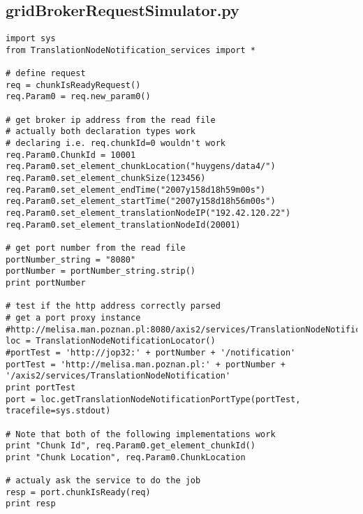 \subsection{gridBrokerRequestSimulator.py}
\begin{verbatim}
import sys
from TranslationNodeNotification_services import *

# define request
req = chunkIsReadyRequest()
req.Param0 = req.new_param0()

# get broker ip address from the read file
# actually both declaration types work
# declaring i.e. req.chunkId=0 wouldn't work
req.Param0.ChunkId = 10001
req.Param0.set_element_chunkLocation("huygens/data4/")
req.Param0.set_element_chunkSize(123456)
req.Param0.set_element_endTime("2007y158d18h59m00s")
req.Param0.set_element_startTime("2007y158d18h56m00s")
req.Param0.set_element_translationNodeIP("192.42.120.22")
req.Param0.set_element_translationNodeId(20001)

# get port number from the read file
portNumber_string = "8080"
portNumber = portNumber_string.strip()
print portNumber

# test if the http address correctly parsed
# get a port proxy instance
#http://melisa.man.poznan.pl:8080/axis2/services/TranslationNodeNotification
loc = TranslationNodeNotificationLocator()
#portTest = 'http://jop32:' + portNumber + '/notification'
portTest = 'http://melisa.man.poznan.pl:' + portNumber +
'/axis2/services/TranslationNodeNotification'
print portTest
port = loc.getTranslationNodeNotificationPortType(portTest,
tracefile=sys.stdout)

# Note that both of the following implementations work
print "Chunk Id", req.Param0.get_element_chunkId()
print "Chunk Location", req.Param0.ChunkLocation

# actualy ask the service to do the job
resp = port.chunkIsReady(req)
print resp
\end{verbatim} 

